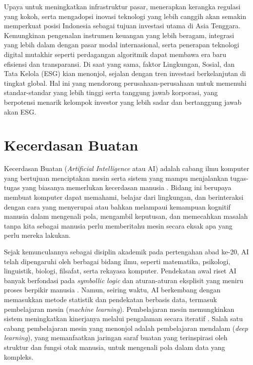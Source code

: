 Upaya untuk meningkatkan infrastruktur pasar, menerapkan kerangka regulasi yang kokoh, serta mengadopsi inovasi teknologi yang lebih canggih akan semakin memperkuat posisi Indonesia sebagai tujuan investasi utama di Asia Tenggara. Kemungkinan pengenalan instrumen keuangan yang lebih beragam, integrasi yang lebih dalam dengan pasar modal internasional, serta penerapan teknologi digital mutakhir seperti perdagangan algoritmik dapat membawa era baru efisiensi dan transparansi. Di saat yang sama, faktor Lingkungan, Sosial, dan Tata Kelola (ESG) kian menonjol, sejalan dengan tren investasi berkelanjutan di tingkat global. Hal ini yang mendorong perusahaan-perusahaan untuk memenuhi standar-standar yang lebih tinggi serta tanggung jawab korporasi, yang berpotensi menarik kelompok investor yang lebih sadar dan bertanggung jawab akan ESG.


\section{Kecerdasan Buatan}
Kecerdasan Buatan (\textit{Artificial Intelligence} atau AI) adalah cabang ilmu komputer yang bertujuan menciptakan mesin serta sistem yang mampu menjalankan tugas-tugas yang biasanya memerlukan kecerdasan manusia \parencite{RussellNorvig2020}. Bidang ini berupaya membuat komputer dapat memahami, belajar dari lingkungan, dan berinteraksi dengan cara yang menyerupai atau bahkan melampaui kemampuan kognitif manusia dalam mengenali pola, mengambil keputusan, dan memecahkan masalah tanpa kita sebagai manusia perlu memberitahu mesin secara eksak apa yang perlu mereka lakukan.

Sejak kemunculannya sebagai disiplin akademik pada pertengahan abad ke-20, AI telah dipengaruhi oleh berbagai bidang ilmu, seperti matematika, psikologi, linguistik, biologi, filsafat, serta rekayasa komputer. Pendekatan awal riset AI banyak berfondasi pada \textit{symbollic logic} dan aturan-aturan eksplisit yang meniru proses berpikir manusia \parencite{RussellNorvig2020}. Namun, seiring waktu, AI berkembang dengan memasukkan metode statistik dan pendekatan berbasis data, termasuk pembelajaran mesin (\textit{machine learning}). Pembelajaran mesin memungkinkan sistem meningkatkan kinerjanya melalui pengalaman secara iteratif \parencite{Goodfellow-et-al-2016}. Salah satu cabang pembelajaran mesin yang menonjol adalah pembelajaran mendalam (\textit{deep learning}), yang memanfaatkan jaringan saraf buatan yang terinspirasi oleh struktur dan fungsi otak manusia, untuk mengenali pola dalam data yang kompleks.

